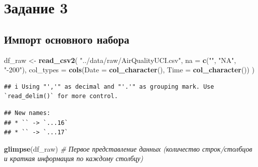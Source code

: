 \documentclass[
]{article}
\newenvironment{Shaded}{\begin{snugshade}}{\end{snugshade}}
\newcommand{\AttributeTok}[1]{\textcolor[rgb]{0.13,0.29,0.53}{#1}}
\newcommand{\CommentTok}[1]{\textcolor[rgb]{0.56,0.35,0.01}{\textit{#1}}}
\newcommand{\FunctionTok}[1]{\textcolor[rgb]{0.13,0.29,0.53}{\textbf{#1}}}
\newcommand{\NormalTok}[1]{#1}
\newcommand{\OtherTok}[1]{\textcolor[rgb]{0.56,0.35,0.01}{#1}}
\newcommand{\StringTok}[1]{\textcolor[rgb]{0.31,0.60,0.02}{#1}}
\begin{document}
\section{Задание 3}\label{ux437ux430ux434ux430ux43dux438ux435-3}

\subsection{Импорт основного
набора}\label{ux438ux43cux43fux43eux440ux442-ux43eux441ux43dux43eux432ux43dux43eux433ux43e-ux43dux430ux431ux43eux440ux430}

\begin{Shaded}
\begin{Highlighting}[]
\NormalTok{df\_raw }\OtherTok{\textless{}{-}} \FunctionTok{read\_csv2}\NormalTok{(}
  \StringTok{"../data/raw/AirQualityUCI.csv"}\NormalTok{,}
  \AttributeTok{na =} \FunctionTok{c}\NormalTok{(}\StringTok{""}\NormalTok{, }\StringTok{"NA"}\NormalTok{, }\StringTok{"{-}200"}\NormalTok{),}
  \AttributeTok{col\_types =} \FunctionTok{cols}\NormalTok{(}\AttributeTok{Date =} \FunctionTok{col\_character}\NormalTok{(), }\AttributeTok{Time =} \FunctionTok{col\_character}\NormalTok{())}
\NormalTok{)}
\end{Highlighting}
\end{Shaded}

\begin{verbatim}
## i Using "','" as decimal and "'.'" as grouping mark. Use `read_delim()` for more control.
\end{verbatim}

\begin{verbatim}
## New names:
## * `` -> `...16`
## * `` -> `...17`
\end{verbatim}

\begin{Shaded}
\begin{Highlighting}[]
\FunctionTok{glimpse}\NormalTok{(df\_raw) }\CommentTok{\# Первое представление данных (количество строк/столбцов и краткая информация по каждому столбцу)}
\end{Highlighting}
\end{Shaded}
\end{document}

